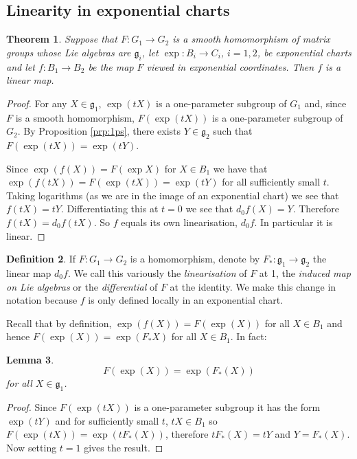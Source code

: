 \documentclass[12pt]{article}
\newtheorem{thm}{Theorem}[section]
\newtheorem{lma}[thm]{Lemma}
\theoremstyle{definition}
\newtheorem{dfn}[thm]{Definition}
\theoremstyle{check}
\theoremstyle{remark}
\theoremstyle{TheoremNum}
\begin{document}
\subsection{Linearity in exponential charts}

\begin{thm}
Suppose that $F\colon G_1\to G_2$ is a smooth homomorphism of matrix groups whose Lie algebras are $\mathfrak{g}_i$, let $\exp\colon B_i\to C_i$, $i=1,2$, be exponential charts and let $f\colon B_1\to B_2$ be the map $F$ viewed in exponential coordinates. Then $f$ is a linear map.
\end{thm}
\begin{proof}
For any $X\in\mathfrak{g}_1$, $\exp(tX)$ is a one-parameter subgroup of $G_1$ and, since $F$ is a smooth homomorphism, $F(\exp(tX))$ is a one-parameter subgroup of $G_2$. By Proposition \ref{prp:1ps}, there exists $Y\in\mathfrak{g}_2$ such that $F(\exp(tX))=\exp(tY)$.

Since $\exp(f(X))=F(\exp X)$ for $X\in B_1$ we have that $\exp(f(tX))=F(\exp(tX))=\exp(tY)$ for all sufficiently small $t$. Taking logarithms (as we are in the image of an exponential chart) we see that $f(tX)=tY$. Differentiating this at $t=0$ we see that $d_0f(X)=Y$. Therefore $f(tX)=d_0f(tX)$. So $f$ equals its own linearisation, $d_0f$. In particular it is linear.
\end{proof}

\begin{dfn}
If $F\colon G_1\to G_2$ is a homomorphism, denote by $F_*\colon\mathfrak{g}_1\to\mathfrak{g}_2$ the linear map $d_0f$. We call this variously the {\em linearisation} of $F$ at 1, the {\em induced map on Lie algebras} or the {\em differential} of $F$ at the identity. We make this change in notation because $f$ is only defined locally in an exponential chart.
\end{dfn}

Recall that by definition, $\exp(f(X))=F(\exp(X))$ for all $X\in B_1$ and hence $F(\exp(X))=\exp(F_*X)$ for all $X\in B_1$. In fact:

\begin{lma}
\[F(\exp(X))=\exp(F_*(X))\]
for all $X\in\mathfrak{g}_1$.
\end{lma}
\begin{proof}
Since $F(\exp(tX))$ is a one-parameter subgroup it has the form $\exp(tY)$ and for sufficiently small $t$, $tX\in B_1$ so $F(\exp(tX))=\exp(tF_*(X))$, therefore $tF_*(X)=tY$ and $Y=F_*(X)$. Now setting $t=1$ gives the result.
\end{proof}
\end{document}
